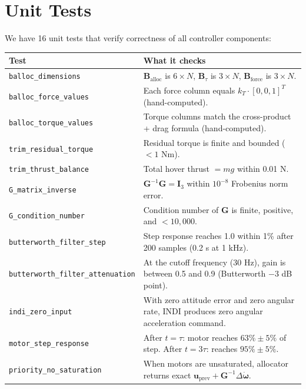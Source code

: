 \documentclass[12pt, a4paper]{article}
\newcommand{\bu}{\bm{u}}
\newcommand{\bomega}{\bm{\omega}}
\newcommand{\bB}{\bm{B}}
\newcommand{\bI}{\bm{I}}
\begin{document}
\section{Unit Tests}
\label{sec:tests}

We have 16 unit tests that verify correctness of all controller components:

\begin{table}[H]
\centering
\small
\begin{tabular}{lp{8cm}}
\toprule
\textbf{Test} & \textbf{What it checks} \\
\midrule
\texttt{balloc\_dimensions} & $\bB_{\text{alloc}}$ is $6 \times N$, $\bB_\tau$ is $3 \times N$, $\bB_{\text{force}}$ is $3 \times N$. \\
\texttt{balloc\_force\_values} & Each force column equals $k_T \cdot [0,0,1]^T$ (hand-computed). \\
\texttt{balloc\_torque\_values} & Torque columns match the cross-product + drag formula (hand-computed). \\
\texttt{trim\_residual\_torque} & Residual torque is finite and bounded ($< 1$ Nm). \\
\texttt{trim\_thrust\_balance} & Total hover thrust $= mg$ within 0.01 N. \\
\texttt{G\_matrix\_inverse} & $\bm{G}^{-1} \bm{G} = \bI_3$ within $10^{-8}$ Frobenius norm error. \\
\texttt{G\_condition\_number} & Condition number of $\bm{G}$ is finite, positive, and $< 10{,}000$. \\
\texttt{butterworth\_filter\_step} & Step response reaches 1.0 within 1\% after 200 samples (0.2 s at 1 kHz). \\
\texttt{butterworth\_filter\_attenuation} & At the cutoff frequency (30 Hz), gain is between 0.5 and 0.9 (Butterworth $-3$ dB point). \\
\texttt{indi\_zero\_input} & With zero attitude error and zero angular rate, INDI produces zero angular acceleration command. \\
\texttt{motor\_step\_response} & After $t = \tau$: motor reaches $63\% \pm 5\%$ of step.  After $t = 3\tau$: reaches $95\% \pm 5\%$. \\
\texttt{priority\_no\_saturation} & When motors are unsaturated, allocator returns exact $\bu_{\text{prev}} + \bm{G}^{-1}\Delta\dot{\bomega}$. \\

\end{tabular}
\end{table}
\end{document}
